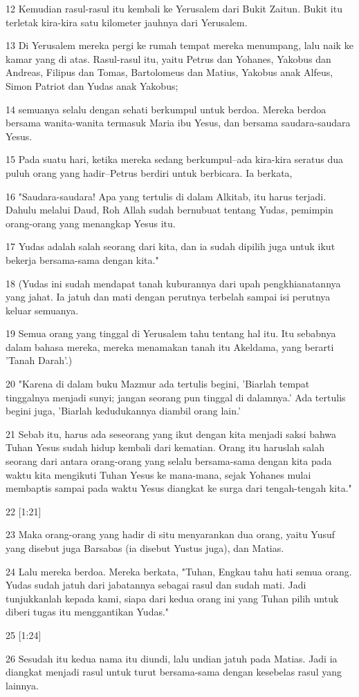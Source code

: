\par 12 Kemudian rasul-rasul itu kembali ke Yerusalem dari Bukit Zaitun. Bukit itu terletak kira-kira satu kilometer jauhnya dari Yerusalem.
\par 13 Di Yerusalem mereka pergi ke rumah tempat mereka menumpang, lalu naik ke kamar yang di atas. Rasul-rasul itu, yaitu Petrus dan Yohanes, Yakobus dan Andreas, Filipus dan Tomas, Bartolomeus dan Matius, Yakobus anak Alfeus, Simon Patriot dan Yudas anak Yakobus;
\par 14 semuanya selalu dengan sehati berkumpul untuk berdoa. Mereka berdoa bersama wanita-wanita termasuk Maria ibu Yesus, dan bersama saudara-saudara Yesus.
\par 15 Pada suatu hari, ketika mereka sedang berkumpul--ada kira-kira seratus dua puluh orang yang hadir--Petrus berdiri untuk berbicara. Ia berkata,
\par 16 "Saudara-saudara! Apa yang tertulis di dalam Alkitab, itu harus terjadi. Dahulu melalui Daud, Roh Allah sudah bernubuat tentang Yudas, pemimpin orang-orang yang menangkap Yesus itu.
\par 17 Yudas adalah salah seorang dari kita, dan ia sudah dipilih juga untuk ikut bekerja bersama-sama dengan kita."
\par 18 (Yudas ini sudah mendapat tanah kuburannya dari upah pengkhianatannya yang jahat. Ia jatuh dan mati dengan perutnya terbelah sampai isi perutnya keluar semuanya.
\par 19 Semua orang yang tinggal di Yerusalem tahu tentang hal itu. Itu sebabnya dalam bahasa mereka, mereka menamakan tanah itu Akeldama, yang berarti 'Tanah Darah'.)
\par 20 "Karena di dalam buku Mazmur ada tertulis begini, 'Biarlah tempat tinggalnya menjadi sunyi; jangan seorang pun tinggal di dalamnya.' Ada tertulis begini juga, 'Biarlah kedudukannya diambil orang lain.'
\par 21 Sebab itu, harus ada seseorang yang ikut dengan kita menjadi saksi bahwa Tuhan Yesus sudah hidup kembali dari kematian. Orang itu haruslah salah seorang dari antara orang-orang yang selalu bersama-sama dengan kita pada waktu kita mengikuti Tuhan Yesus ke mana-mana, sejak Yohanes mulai membaptis sampai pada waktu Yesus diangkat ke surga dari tengah-tengah kita."
\par 22 [1:21]
\par 23 Maka orang-orang yang hadir di situ menyarankan dua orang, yaitu Yusuf yang disebut juga Barsabas (ia disebut Yustus juga), dan Matias.
\par 24 Lalu mereka berdoa. Mereka berkata, "Tuhan, Engkau tahu hati semua orang. Yudas sudah jatuh dari jabatannya sebagai rasul dan sudah mati. Jadi tunjukkanlah kepada kami, siapa dari kedua orang ini yang Tuhan pilih untuk diberi tugas itu menggantikan Yudas."
\par 25 [1:24]
\par 26 Sesudah itu kedua nama itu diundi, lalu undian jatuh pada Matias. Jadi ia diangkat menjadi rasul untuk turut bersama-sama dengan kesebelas rasul yang lainnya.

